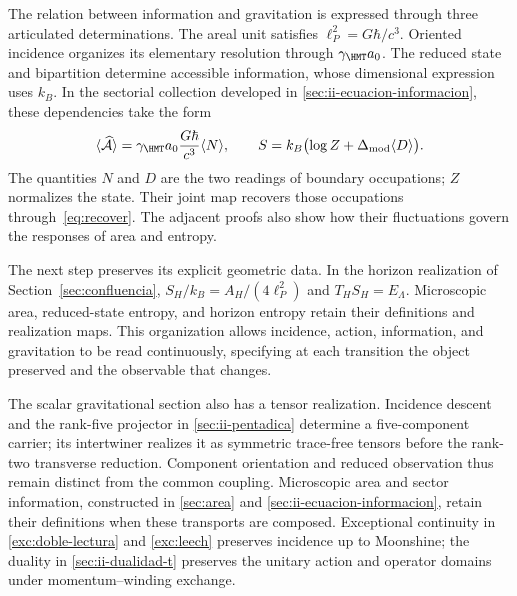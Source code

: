 The relation between information and gravitation is expressed through three
articulated determinations. The areal unit satisfies
$\ell_P^2=G\hbar/c^3$. Oriented incidence organizes its elementary
resolution through $\gamma_{\HMT}a_0$. The reduced state and bipartition
determine accessible information, whose dimensional expression uses
$k_B$. In the sectorial collection developed in
\ref{sec:ii-ecuacion-informacion}, these dependencies take the form
\begin{equation}
 \langle\widehat{\mathcal A}\rangle
 =\gamma_{\HMT}a_0\frac{G\hbar}{c^3}\langle N\rangle,
 \qquad
 S=k_B\bigl(\log Z+\Delta_{\rm mod}\langle D\rangle\bigr).
 \label{eq:ii-intro-area-informacion}
\end{equation}
The quantities $N$ and $D$ are the two readings of boundary
occupations; $Z$ normalizes the state. Their joint map recovers those
occupations through~\eqref{eq:recover}. The adjacent proofs also show
how their fluctuations govern the responses of area and
entropy.

The next step preserves its explicit geometric data. In the
horizon realization of Section~\ref{sec:confluencia},
$S_H/k_B=A_H/(4\ell_P^2)$ and $T_HS_H=E_\Lambda$.
Microscopic area, reduced-state entropy, and horizon
entropy retain their definitions and realization maps.
This organization allows incidence, action,
information, and gravitation to be read continuously, specifying at each transition the object
preserved and the observable that changes.

The scalar gravitational section also has a tensor realization.
Incidence descent and the rank-five projector in
\ref{sec:ii-pentadica} determine a five-component carrier;
its intertwiner realizes it as symmetric trace-free tensors before
the rank-two transverse reduction. Component orientation and
reduced observation thus remain distinct from the common coupling.
Microscopic area and sector information, constructed in
\ref{sec:area} and \ref{sec:ii-ecuacion-informacion}, retain their
definitions when these transports are composed. Exceptional continuity
in \ref{exc:doble-lectura} and \ref{exc:leech} preserves incidence
up to Moonshine; the duality in \ref{sec:ii-dualidad-t} preserves
the unitary action and operator domains under momentum--winding
exchange.

\par\endgroup
